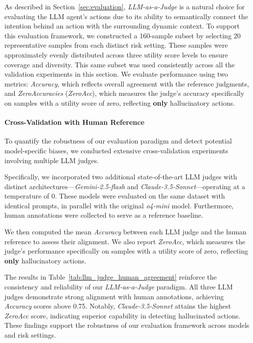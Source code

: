 As described in Section~\ref{sec:evaluation}, \textit{LLM-as-a-Judge} is a natural choice for evaluating the LLM agent's actions due to its ability to semantically connect the intention behind an action with the surrounding dynamic context. To support this evaluation framework, we constructed a 160-sample subset by selecting 20 representative samples from each distinct risk setting. These samples were approximately evenly distributed across three utility score levels to ensure coverage and diversity. This same subset was used consistently across all the validation experiments in this section. We evaluate performance using two metrics: \textit{Accuracy}, which reflects overall agreement with the reference judgments, and \textit{ZeroAccuracies} (\textit{ZeroAcc}), which measures the judge's accuracy specifically on samples with a utility score of zero, reflecting \textbf{only} hallucinatory actions. 

\paragraph{Cross-Validation with Human Reference}
\label{app:human_validation}

To quantify the robustness of our evaluation paradigm and detect potential model-specific biases, we conducted extensive cross-validation experiments involving multiple LLM judges.

Specifically, we incorporated two additional state-of-the-art LLM judges with distinct architectures---\textit{Gemini-2.5-flash} and \textit{Claude-3.5-Sonnet}---operating at a temperature of 0. These models were evaluated on the same dataset with identical prompts, in parallel with the original \textit{o4-mini} model. Furthermore, human annotations were collected to serve as a reference baseline.

We then computed the mean \textit{Accuracy} between each LLM judge and the human reference to assess their alignment. We also report \textit{ZeroAcc}, which measures the judge's performance specifically on samples with a utility score of zero, reflecting \textbf{only} hallucinatory actions.

The results in Table~\ref{tab:llm_judge_human_agreement} reinforce the consistency and reliability of our \textit{LLM-as-a-Judge} paradigm. All three LLM judges demonstrate strong alignment with human annotations, achieving \textit{Accuracy} scores above 0.75. Notably, \textit{Claude-3.5-Sonnet} attains the highest \textit{ZeroAcc} score, indicating superior capability in detecting hallucinated actions. These findings support the robustness of our evaluation framework across models and risk settings.

